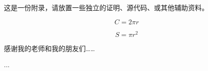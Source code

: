 \documentclass[lang=chs, degree=master, blindreview=false, adobe=false, academic=true]{yanputhesis}
\begin{document}
这是一份附录，请放置一些独立的证明、源代码、或其他辅助资料。


\begin{equation}
    C = 2 \pi r
\end{equation}

\begin{equation}
    S = \pi r^2
\end{equation}

\cleardoublepage

\backmatter                                                 %
\begin{acknowledgements}                                    %
    感谢我的老师和我的朋友们……
\end{acknowledgements}                                      %
\begin{accomplishments}                                     %
    [1] ...
\end{accomplishments}                                       %
\makestatement                                              %
\end{document}
